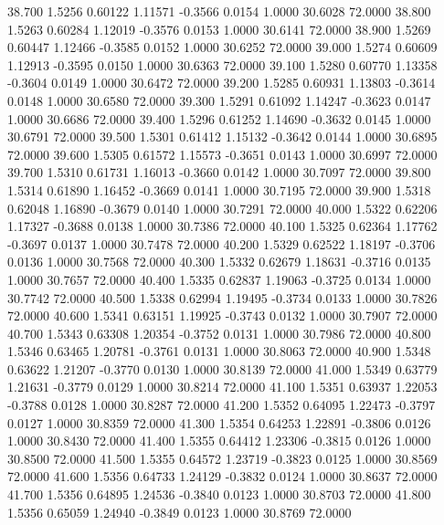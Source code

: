  38.700   1.5256   0.60122   1.11571  -0.3566   0.0154   1.0000  30.6028  72.0000
  38.800   1.5263   0.60284   1.12019  -0.3576   0.0153   1.0000  30.6141  72.0000
  38.900   1.5269   0.60447   1.12466  -0.3585   0.0152   1.0000  30.6252  72.0000
  39.000   1.5274   0.60609   1.12913  -0.3595   0.0150   1.0000  30.6363  72.0000
  39.100   1.5280   0.60770   1.13358  -0.3604   0.0149   1.0000  30.6472  72.0000
  39.200   1.5285   0.60931   1.13803  -0.3614   0.0148   1.0000  30.6580  72.0000
  39.300   1.5291   0.61092   1.14247  -0.3623   0.0147   1.0000  30.6686  72.0000
  39.400   1.5296   0.61252   1.14690  -0.3632   0.0145   1.0000  30.6791  72.0000
  39.500   1.5301   0.61412   1.15132  -0.3642   0.0144   1.0000  30.6895  72.0000
  39.600   1.5305   0.61572   1.15573  -0.3651   0.0143   1.0000  30.6997  72.0000
  39.700   1.5310   0.61731   1.16013  -0.3660   0.0142   1.0000  30.7097  72.0000
  39.800   1.5314   0.61890   1.16452  -0.3669   0.0141   1.0000  30.7195  72.0000
  39.900   1.5318   0.62048   1.16890  -0.3679   0.0140   1.0000  30.7291  72.0000
  40.000   1.5322   0.62206   1.17327  -0.3688   0.0138   1.0000  30.7386  72.0000
  40.100   1.5325   0.62364   1.17762  -0.3697   0.0137   1.0000  30.7478  72.0000
  40.200   1.5329   0.62522   1.18197  -0.3706   0.0136   1.0000  30.7568  72.0000
  40.300   1.5332   0.62679   1.18631  -0.3716   0.0135   1.0000  30.7657  72.0000
  40.400   1.5335   0.62837   1.19063  -0.3725   0.0134   1.0000  30.7742  72.0000
  40.500   1.5338   0.62994   1.19495  -0.3734   0.0133   1.0000  30.7826  72.0000
  40.600   1.5341   0.63151   1.19925  -0.3743   0.0132   1.0000  30.7907  72.0000
  40.700   1.5343   0.63308   1.20354  -0.3752   0.0131   1.0000  30.7986  72.0000
  40.800   1.5346   0.63465   1.20781  -0.3761   0.0131   1.0000  30.8063  72.0000
  40.900   1.5348   0.63622   1.21207  -0.3770   0.0130   1.0000  30.8139  72.0000
  41.000   1.5349   0.63779   1.21631  -0.3779   0.0129   1.0000  30.8214  72.0000
  41.100   1.5351   0.63937   1.22053  -0.3788   0.0128   1.0000  30.8287  72.0000
  41.200   1.5352   0.64095   1.22473  -0.3797   0.0127   1.0000  30.8359  72.0000
  41.300   1.5354   0.64253   1.22891  -0.3806   0.0126   1.0000  30.8430  72.0000
  41.400   1.5355   0.64412   1.23306  -0.3815   0.0126   1.0000  30.8500  72.0000
  41.500   1.5355   0.64572   1.23719  -0.3823   0.0125   1.0000  30.8569  72.0000
  41.600   1.5356   0.64733   1.24129  -0.3832   0.0124   1.0000  30.8637  72.0000
  41.700   1.5356   0.64895   1.24536  -0.3840   0.0123   1.0000  30.8703  72.0000
  41.800   1.5356   0.65059   1.24940  -0.3849   0.0123   1.0000  30.8769  72.0000
